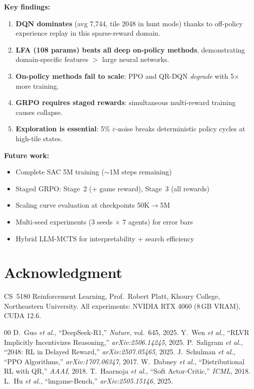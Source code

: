 \documentclass[conference, 10pt]{IEEEtran}
\begin{document}
\textbf{Key findings:}
\begin{enumerate}[nosep,leftmargin=*]
    \item \textbf{DQN dominates} (avg 7,744, tile 2048 in hunt mode) thanks to off-policy experience replay in this sparse-reward domain.
    \item \textbf{LFA (108 params) beats all deep on-policy methods}, demonstrating domain-specific features $>$ large neural networks.
    \item \textbf{On-policy methods fail to scale}: PPO and QR-DQN \emph{degrade} with 5$\times$ more training.
    \item \textbf{GRPO requires staged rewards}: simultaneous multi-reward training causes collapse.
    \item \textbf{Exploration is essential}: 5\% $\varepsilon$-noise breaks deterministic policy cycles at high-tile states.
\end{enumerate}

\textbf{Future work:}
\begin{itemize}[nosep,leftmargin=*]
    \item Complete SAC 5M training ($\sim$1M steps remaining)
    \item Staged GRPO: Stage~2 (+ game reward), Stage~3 (all rewards)
    \item Scaling curve evaluation at checkpoints 50K$\to$5M
    \item Multi-seed experiments (3 seeds $\times$ 7 agents) for error bars
    \item Hybrid LLM-MCTS for interpretability + search efficiency
\end{itemize}

\section*{Acknowledgment}

CS~5180 Reinforcement Learning, Prof.\ Robert Platt, Khoury College, Northeastern University.  All experiments: NVIDIA RTX 4060 (8\,GB VRAM), CUDA 12.6.

\begin{thebibliography}{00}
 D.~Guo \textit{et al.}, ``DeepSeek-R1,'' \textit{Nature}, vol.~645, 2025.
 Y.~Wen \textit{et al.}, ``RLVR Implicitly Incentivizes Reasoning,'' \textit{arXiv:2506.14245}, 2025.
 P.~Saligram \textit{et al.}, ``2048: RL in Delayed Reward,'' \textit{arXiv:2507.05465}, 2025.
 J.~Schulman \textit{et al.}, ``PPO Algorithms,'' \textit{arXiv:1707.06347}, 2017.
 W.~Dabney \textit{et al.}, ``Distributional RL with QR,'' \textit{AAAI}, 2018.
 T.~Haarnoja \textit{et al.}, ``Soft Actor-Critic,'' \textit{ICML}, 2018.
 L.~Hu \textit{et al.}, ``lmgame-Bench,'' \textit{arXiv:2505.15146}, 2025.
\end{thebibliography}
\end{document}
